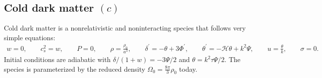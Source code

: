 \documentclass{aa}
\newcommand\scrH{\mathscr{H}}
\begin{document}
\subsection{Cold dark matter \texorpdfstring{$(c)$}{(c)}}
\label{sec:cdm}
Cold dark matter is a nonrelativistic and noninteracting species that follows very simple equations:
\begin{align*}
w = 0 , \qquad
{c_s^2} = w , \qquad
P = 0 , \qquad
\rho = \frac{\rho_0}{a^{3}} , \qquad
\delta^\prime = - \theta + 3 \Phi^\prime , \qquad
\theta^\prime = - \scrH \theta + k^{2} \Psi , \qquad
u = \frac{\theta}{k} , \qquad
\sigma = 0 .
\end{align*}
Initial conditions are adiabatic with $\delta/(1+w) = -3 \Psi / 2$ and $\theta = k^2 \tau \Psi / 2$.
The species is parameterized by the reduced density $\Omega_0 = \frac{8\pi}{3}\rho_0$ today.
\end{document}
